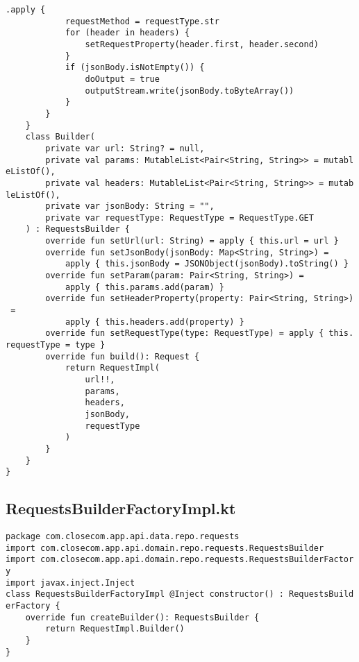 \documentclass[listing]{espd}
\begin{document}
\begin{verbatim}
.apply {
            requestMethod = requestType.str
            for (header in headers) {
                setRequestProperty(header.first, header.second)
            }
            if (jsonBody.isNotEmpty()) {
                doOutput = true
                outputStream.write(jsonBody.toByteArray())
            }
        }
    }
    class Builder(
        private var url: String? = null,
        private val params: MutableList<Pair<String, String>> = mutabl
eListOf(),
        private val headers: MutableList<Pair<String, String>> = mutab
leListOf(),
        private var jsonBody: String = "",
        private var requestType: RequestType = RequestType.GET
    ) : RequestsBuilder {
        override fun setUrl(url: String) = apply { this.url = url }
        override fun setJsonBody(jsonBody: Map<String, String>) =
            apply { this.jsonBody = JSONObject(jsonBody).toString() }
        override fun setParam(param: Pair<String, String>) =
            apply { this.params.add(param) }
        override fun setHeaderProperty(property: Pair<String, String>)
 =
            apply { this.headers.add(property) }
        override fun setRequestType(type: RequestType) = apply { this.
requestType = type }
        override fun build(): Request {
            return RequestImpl(
                url!!,
                params,
                headers,
                jsonBody,
                requestType
            )
        }
    }
}
\end{verbatim}

\subsection{RequestsBuilderFactoryImpl.kt}
\begin{verbatim}
package com.closecom.app.api.data.repo.requests
import com.closecom.app.api.domain.repo.requests.RequestsBuilder
import com.closecom.app.api.domain.repo.requests.RequestsBuilderFactor
y
import javax.inject.Inject
class RequestsBuilderFactoryImpl @Inject constructor() : RequestsBuild
erFactory {
    override fun createBuilder(): RequestsBuilder {
        return RequestImpl.Builder()
    }
}
\end{verbatim}
\end{document}
